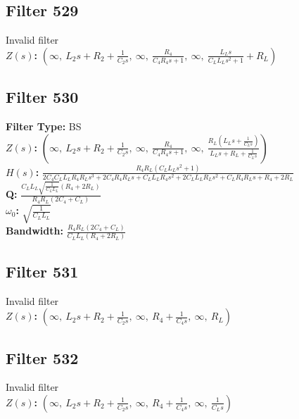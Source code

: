 \documentclass{article}
\begin{document}
\subsection*{Filter 529}
Invalid filter \\ 
\textbf{$Z(s)$:} $\left( \infty, \  L_{2} s + R_{2} + \frac{1}{C_{2} s}, \  \infty, \  \frac{R_{4}}{C_{4} R_{4} s + 1}, \  \infty, \  \frac{L_{L} s}{C_{L} L_{L} s^{2} + 1} + R_{L}\right)$ \\ 
\subsection*{Filter 530}
\textbf{Filter Type:} BS \\ 
\textbf{$Z(s)$:} $\left( \infty, \  L_{2} s + R_{2} + \frac{1}{C_{2} s}, \  \infty, \  \frac{R_{4}}{C_{4} R_{4} s + 1}, \  \infty, \  \frac{R_{L} \left(L_{L} s + \frac{1}{C_{L} s}\right)}{L_{L} s + R_{L} + \frac{1}{C_{L} s}}\right)$ \\ 
\textbf{$H(s)$:} $\frac{R_{4} R_{L} \left(C_{L} L_{L} s^{2} + 1\right)}{2 C_{4} C_{L} L_{L} R_{4} R_{L} s^{3} + 2 C_{4} R_{4} R_{L} s + C_{L} L_{L} R_{4} s^{2} + 2 C_{L} L_{L} R_{L} s^{2} + C_{L} R_{4} R_{L} s + R_{4} + 2 R_{L}}$ \\ 
\textbf{Q:} $\frac{C_{L} L_{L} \sqrt{\frac{1}{C_{L} L_{L}}} \left(R_{4} + 2 R_{L}\right)}{R_{4} R_{L} \left(2 C_{4} + C_{L}\right)}$ \\ 
\textbf{$\omega_0$:} $\sqrt{\frac{1}{C_{L} L_{L}}}$ \\ 
\textbf{Bandwidth:} $\frac{R_{4} R_{L} \left(2 C_{4} + C_{L}\right)}{C_{L} L_{L} \left(R_{4} + 2 R_{L}\right)}$ \\ 
\subsection*{Filter 531}
Invalid filter \\ 
\textbf{$Z(s)$:} $\left( \infty, \  L_{2} s + R_{2} + \frac{1}{C_{2} s}, \  \infty, \  R_{4} + \frac{1}{C_{4} s}, \  \infty, \  R_{L}\right)$ \\ 
\subsection*{Filter 532}
Invalid filter \\ 
\textbf{$Z(s)$:} $\left( \infty, \  L_{2} s + R_{2} + \frac{1}{C_{2} s}, \  \infty, \  R_{4} + \frac{1}{C_{4} s}, \  \infty, \  \frac{1}{C_{L} s}\right)$ \\ 
\end{document}
